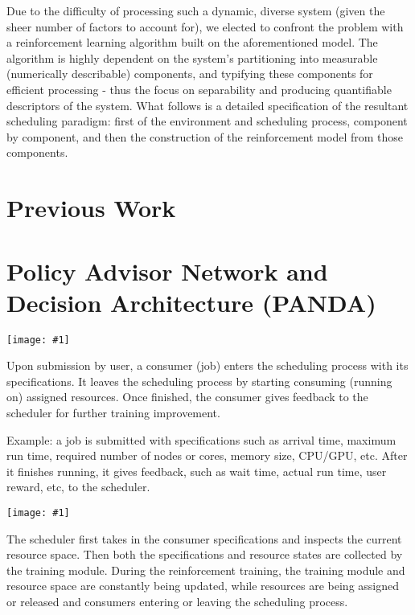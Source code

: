 \documentclass{article}
\theoremstyle{definition}
\theoremstyle{remark}
\newcommand{\addpic}[1]{\texttt{[image: \#1]}}
\begin{document}
	Due to the difficulty of processing such a dynamic, diverse system (given the sheer number of factors to account
	for), we elected to confront the problem with a reinforcement learning algorithm built on the aforementioned model.
	The algorithm is highly dependent on the system's partitioning into measurable (numerically describable)
	components, and typifying these components for efficient processing - thus the focus on separability and producing
	quantifiable descriptors of the system. What follows is a detailed specification of the resultant scheduling
	paradigm: first of the environment and scheduling process, component by component, and then the construction of
	the reinforcement model from those components.
	
	\newpage
	
	\section{Previous Work}
	
	\section{Policy Advisor Network and Decision Architecture (PANDA)}
	

	
	\addpic{figures/Macro-fix.png} 
	
	
	Upon submission by user, a consumer (job) enters the scheduling process with its specifications. It leaves the scheduling process by starting consuming (running on) assigned resources. Once finished, the consumer gives feedback to the scheduler for further training improvement.
	
	Example: a job is submitted with specifications such as arrival time, maximum run time, required number of nodes or cores, memory size, CPU/GPU, etc. After it finishes running, it gives feedback, such as wait time, actual run time, user reward, etc, to the scheduler.
	
	\addpic{figures/Intro-Scheduler.jpg}
	
	The scheduler first takes in the consumer specifications and inspects the current resource space. Then both the specifications and resource states are collected by the training module. During the reinforcement training, the training module and resource space are constantly being updated, while resources are being assigned or released and consumers entering or leaving the scheduling process.
	
\end{document}
